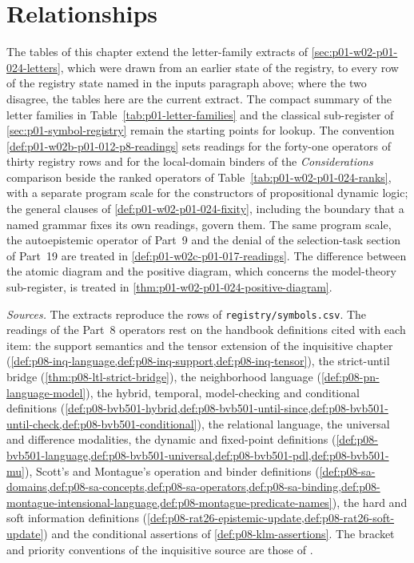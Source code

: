 \section{Relationships}
\label{sec:p01-w02b-p01-012-relationships}

The tables of this chapter extend the letter-family extracts of
\cref{sec:p01-w02-p01-024-letters}, which were drawn from an earlier state
of the registry, to every row of the registry state named in the inputs
paragraph above; where the two disagree, the tables here are the current
extract.  The compact summary of the letter families in
Table~\ref{tab:p01-letter-families} and the classical sub-register of
\cref{sec:p01-symbol-registry} remain the starting points for lookup.
The convention \cref{def:p01-w02b-p01-012-p8-readings} sets
readings for the forty-one operators of thirty registry rows and for the
local-domain binders of the \emph{Considerations} comparison beside the
ranked operators of
Table~\ref{tab:p01-w02-p01-024-ranks}, with a separate program scale for
the constructors of propositional dynamic logic; the general
clauses of \cref{def:p01-w02-p01-024-fixity}, including the boundary that
a named grammar fixes its own readings, govern them.  The same program
scale, the autoepistemic operator of Part~9 and the denial of the
selection-task section of Part~19 are treated in
\cref{def:p01-w02c-p01-017-readings}.  The difference
between the atomic diagram and the positive diagram, which concerns the
model-theory sub-register, is treated in
\cref{thm:p01-w02-p01-024-positive-diagram}.

\emph{Sources.}  The extracts reproduce the rows of
\texttt{registry/symbols.csv}.  The readings of the Part~8 operators rest
on the handbook definitions cited with each item: the support semantics
and the tensor extension of the inquisitive chapter
(\cref{def:p08-inq-language,def:p08-inq-support,def:p08-inq-tensor}), the
strict-until bridge (\cref{thm:p08-ltl-strict-bridge}), the neighborhood
language (\cref{def:p08-pn-language-model}), the hybrid, temporal,
model-checking and conditional definitions
(\cref{def:p08-bvb501-hybrid,def:p08-bvb501-until-since,def:p08-bvb501-until-check,def:p08-bvb501-conditional}),
the relational language, the universal and difference modalities, the
dynamic and fixed-point definitions
(\cref{def:p08-bvb501-language,def:p08-bvb501-universal,def:p08-bvb501-pdl,def:p08-bvb501-mu}),
Scott's and Montague's operation and binder definitions
(\cref{def:p08-sa-domains,def:p08-sa-concepts,def:p08-sa-operators,def:p08-sa-binding,def:p08-montague-intensional-language,def:p08-montague-predicate-names}),
the hard and soft information definitions
(\cref{def:p08-rat26-epistemic-update,def:p08-rat26-soft-update}) and the
conditional assertions of \cref{def:p08-klm-assertions}.
The bracket and priority conventions of the inquisitive source are those of
\cite[\S3.1, p.~57; Definitions~3.2.1--3.2.2, p.~60; \S5.1, pp.~125--126]{Ciardelli2023InquisitivePropositional}.
